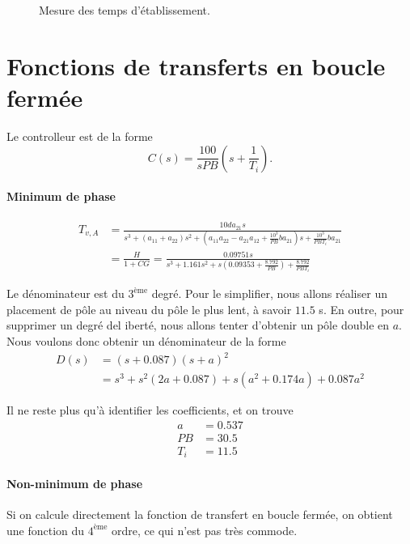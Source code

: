 \documentclass[frenchb, paper=a4, fontsize=11pt]{scrartcl}
\numberwithin{equation}{section}					%
\numberwithin{figure}{section}					%
\numberwithin{table}{section}						%
\begin{document}
\begin{figure}[ht]
	\centering
	
	\caption{Mesure des temps d'établissement.}
	\label{fig:settling-time}
\end{figure}

\section{Fonctions de transferts en boucle fermée}
Le controlleur est de la forme
\begin{equation}
C(s) = \frac{100}{sPB}(s+\frac{1}{T_i}).
\end{equation}
\paragraph{Minimum de phase}

\begin{align*}
T_{v,A}&= \frac{10da_{21}s}{s^3+(a_{11}+a_{22})s^2 + (a_{11}a_{22}-a_{21}a_{12} + \frac{10^3}{PB}ba_{21})s + \frac{10^3}{PBT_i}ba_{21}}\\
&=\frac{H}{1+CG}= \frac{0.09751s}{s^3+1.161 s^2 + s(0.09353 + \frac{8.792}{PB}) + \frac{8.792}{PB T_i}}
\end{align*}

Le dénominateur est du $3^{\text{ème}}$ degré. Pour le simplifier, nous allons réaliser un placement de pôle au niveau du pôle le plus lent, à savoir $11.5$ s. En outre, pour supprimer un degré del iberté, nous allons tenter d'obtenir un pôle double en $a$.
Nous voulons donc obtenir un dénominateur de la forme
\begin{align*}
D(s) &= (s+0.087)(s+a)^2\\
&= s^3 + s^2 (2a+0.087) + s(a^2 + 0.174a) + 0.087a^2
\end{align*}

Il ne reste plus qu'à identifier les coefficients, et on trouve
\begin{align*}
a&=0.537\\
PB&=30.5\\
T_i &= 11.5
\end{align*}

\paragraph{Non-minimum de phase}

Si on calcule directement la fonction de transfert en boucle fermée, on obtient une fonction du $4^{\text{ème}}$ ordre, ce qui n'est pas très commode.
\end{document}

